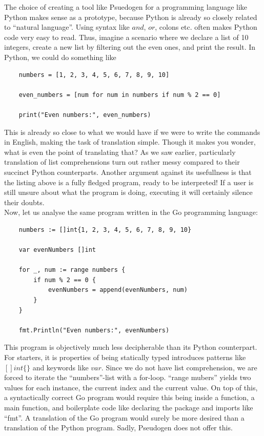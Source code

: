 The choice of creating a tool like Psuedogen for a programming language like Python makes sense as a prototype, because Python is already so closely related to ``natural language''. Using syntax like $and$, $or$, colons etc. often makes Python code very easy to read. Thus, imagine a scenario where we declare a list of 10 integers, create a new list by filtering out the even ones, and print the result. In Python, we could do something like

\begin{verbatim}
    numbers = [1, 2, 3, 4, 5, 6, 7, 8, 9, 10]

    even_numbers = [num for num in numbers if num % 2 == 0]

    print("Even numbers:", even_numbers)
\end{verbatim}

This is already so close to what we would have if we were to write the commands in English, making the task of translation simple. Though it makes you wonder, what is even the point of translating that? As we saw earlier, particularly translation of list comprehensions turn out rather messy compared to their succinct Python counterparts. Another argument against its usefullness is that the listing above is a fully fledged program, ready to be interpreted! If a user is still unsure about what the program is doing, executing it will certainly silence their doubts. \hfill \\

Now, let us analyse the same program written in the Go programming language:

\begin{verbatim}
    numbers := []int{1, 2, 3, 4, 5, 6, 7, 8, 9, 10}

    var evenNumbers []int

    for _, num := range numbers {
        if num % 2 == 0 {
            evenNumbers = append(evenNumbers, num)
        }
    }

    fmt.Println("Even numbers:", evenNumbers)
\end{verbatim}

This program is objectively much less decipherable than its Python counterpart. For starters, it is properties of being statically typed introduces patterns like $[]int\{\}$ and keywords like $var$. Since we do not have list comprehension, we are forced to iterate the ``numbers''-list with a for-loop. ``range mubers'' yields two values for each instance, the current index and the current value. On top of this, a syntactically correct Go program would require this being inside a function, a main function, and boilerplate code like declaring the package and imports like ``fmt''. A translation of the Go program would surely be more desired than a translation of the Python program. Sadly, Pseudogen does not offer this. \hfill \\

